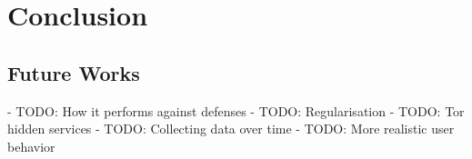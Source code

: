 \section{Conclusion}

\subsection{Future Works}
- TODO: How it performs against defenses
- TODO: Regularisation
- TODO: Tor hidden services
- TODO: Collecting data over time
- TODO: More realistic user behavior
